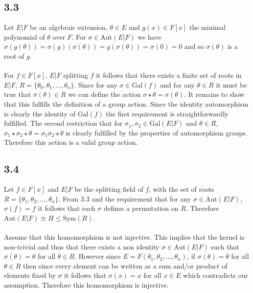 \documentclass{article}
\begin{document}
\subsection*{3.3}
Let $E|F$ be an algebraic extension, $\theta \in E$ and $g(x) \in F[x]$ the minimal polynomial of 
$\theta$ over $F$. For $\sigma \in \text{Aut}(E|F)$ we have $\sigma(g(\theta)) = \sigma(g)(\sigma(\theta)) = g(\sigma(\theta)) = \sigma(0) = 0$ 
and so $\sigma(\theta)$ is a root of $g$.

\paragraph{}
For $f \in F[x]$, $E|F$ splitting $f$ it follows that there exists a finite set of roots in 
$E|F$, $R = \{\theta_0,\theta_1,\dots,\theta_n\}$. Since for any $\sigma \in \text{Gal}(f)$ and for 
any $\theta \in R$ it must be true that $\sigma(\theta) \in R$ we can define the action $\sigma \star \theta = \sigma(\theta)$. 
It remains to show that this fulfills the definition of a group action. Since the identity automorphism 
is clearly the identity of $\text{Gal}(f)$ the first requirement is straightforwardly fulfilled. 
The second restriction that for $\sigma_1,\sigma_2 \in \text{Gal}(E|F)$ and $\theta \in R$, 
$\sigma_1 \star \sigma_2 \star \theta = \sigma_1\sigma_2 \star \theta$ is clearly fulfilled by the 
properties of automorphism groups. Therefore this action is a valid group action.

\subsection*{3.4}
Let $f \in F[x]$ and $E|F$ be the splitting field of $f$, with the set of roots $R = \{\theta_1,\theta_2,\dots,\theta_n\}$. 
From 3.3 and the requirement that for any $\sigma \in \text{Aut}(E|F)$, $\sigma(f) = f$ it 
follows that each $\sigma$ defines a permutation on $R$. Therefore $\text{Aut}(E|F) \cong H \leq \text{Sym}(R)$. 

\paragraph{}
Assume that this homomorphism is not injective. This implies that the kernel is non-trivial and thus that 
there exists a non identity $\sigma \in \text{Aut}(E|F)$ such that $\sigma(\theta) = \theta$ for all 
$\theta \in R$. However since $E = F(\theta_1,\theta_2,\dots,\theta_n)$, if $\sigma(\theta) = \theta$ for all $\theta \in R$ then since 
every element can be written as a sum and/or product of elements fixed by $\sigma$ it follows that 
$\sigma(x) = x$ for all $x \in E$ which contradicts our assumption. Therefore this homomorphism is injective.
\end{document}
